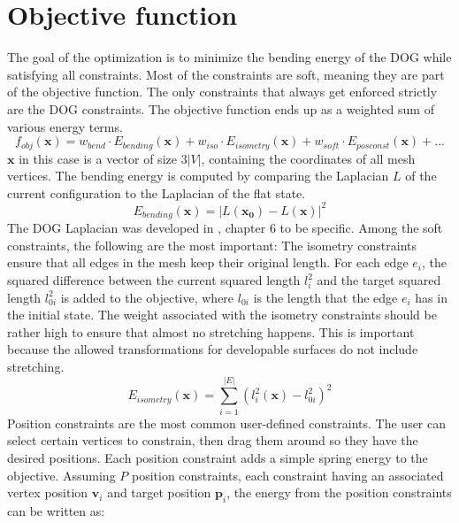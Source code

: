 \documentclass[a4paper,twoside,12pt,nochapterprefix]{scrbook}
\begin{document}
\section{Objective function}\label{sec:objective}
The goal of the optimization is to minimize the bending energy of the DOG while satisfying all constraints. Most of the constraints are soft, meaning they are part of the objective function. The only constraints that always get enforced strictly are the DOG constraints. The objective function ends up as a weighted sum of various energy terms.
\begin{equation}
f_{obj}(\mathbf{x}) = w_{bend} \cdot E_{bending}(\mathbf{x}) + w_{iso} \cdot E_{isometry}(\mathbf{x}) + w_{soft} \cdot E_{posconst}(\mathbf{x}) + ...
\end{equation}
$\mathbf{x}$ in this case is a vector of size $3|V|$, containing the coordinates of all mesh vertices.\newline
The bending energy is computed by comparing the Laplacian $L$ of the current configuration to the Laplacian of the flat state.
\begin{equation}
E_{bending}(\mathbf{x}) = |L(\mathbf{x_0}) - L(\mathbf{x})|^2
\end{equation}
The DOG Laplacian was developed in \cite{Rabinovich:DogShapeSpace:2018}, chapter $6$ to be specific.\newline
Among the soft constraints, the following are the most important:\newline
The isometry constraints ensure that all edges in the mesh keep their original length. For each edge $e_i$, the squared difference between the current squared length $l_i^2$ and the target squared length $l_{0i}^2$ is added to the objective, where $l_{0i}$ is the length that the edge $e_i$ has in the initial state. The weight associated with the isometry constraints should be rather high to ensure that almost no stretching happens. This is important because the allowed transformations for developable surfaces do not include stretching.
\begin{equation}
E_{isometry}(\mathbf{x}) = \sum_{i = 1}^{|E|} (l_i^2(\mathbf{x}) - l_{0i}^2)^2
\end{equation}
Position constraints are the most common user-defined constraints. The user can select certain vertices to constrain, then drag them around so they have the desired positions. Each position constraint adds a simple spring energy to the objective. Assuming $P$ position constraints, each constraint having an associated vertex position $\mathbf{v}_i$ and target position $\mathbf{p}_i$, the energy from the position constraints can be written as:
\end{document}

